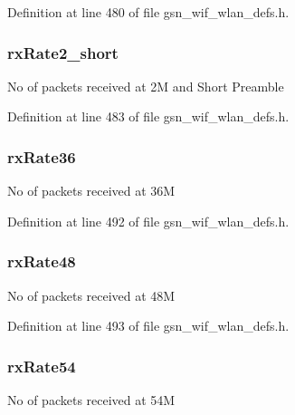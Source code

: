 Definition at line 480 of file gsn\_\-wif\_\-wlan\_\-defs.h.

\hypertarget{a00419_a5c988a8eef022740b4c0145646a9ef5b}{
\subsubsection[{rxRate2\_\-short}]{ {\bf rxRate2\_\-short}}}
\label{a00419_a5c988a8eef022740b4c0145646a9ef5b}
No of packets received at 2M and Short Preamble 

Definition at line 483 of file gsn\_\-wif\_\-wlan\_\-defs.h.

\hypertarget{a00419_a979cd4d132b50b48b8e739232ebbb5a8}{
\subsubsection[{rxRate36}]{ {\bf rxRate36}}}
\label{a00419_a979cd4d132b50b48b8e739232ebbb5a8}
No of packets received at 36M 

Definition at line 492 of file gsn\_\-wif\_\-wlan\_\-defs.h.

\hypertarget{a00419_a59664069949e7b8e26a8be0972f49807}{
\subsubsection[{rxRate48}]{ {\bf rxRate48}}}
\label{a00419_a59664069949e7b8e26a8be0972f49807}
No of packets received at 48M 

Definition at line 493 of file gsn\_\-wif\_\-wlan\_\-defs.h.

\hypertarget{a00419_ab4c8a5c19599e0b23c31964efa3570af}{
\subsubsection[{rxRate54}]{ {\bf rxRate54}}}
\label{a00419_ab4c8a5c19599e0b23c31964efa3570af}
No of packets received at 54M 

